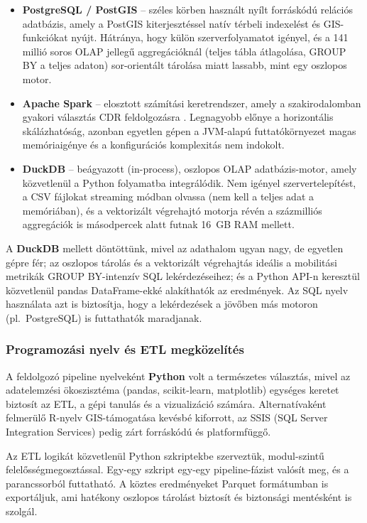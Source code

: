 \begin{itemize}
    \item \textbf{PostgreSQL / PostGIS} -- széles körben használt nyílt forráskódú relációs adatbázis, amely a PostGIS kiterjesztéssel natív térbeli indexelést és GIS-funkciókat nyújt. Hátránya, hogy külön szerverfolyamatot igényel, és a 141 millió soros OLAP jellegű aggregációknál (teljes tábla átlagolása, GROUP BY a teljes adaton) sor-orientált tárolása miatt lassabb, mint egy oszlopos motor.
    \item \textbf{Apache Spark} -- elosztott számítási keretrendszer, amely a szakirodalomban gyakori választás CDR feldolgozásra \cite{zhang2019connected}. Legnagyobb előnye a horizontális skálázhatóság, azonban egyetlen gépen a JVM-alapú futtatókörnyezet magas memóriaigénye és a konfigurációs komplexitás nem indokolt.
    \item \textbf{DuckDB} -- beágyazott (in-process), oszlopos OLAP adatbázis-motor, amely közvetlenül a Python folyamatba integrálódik. Nem igényel szervertelepítést, a CSV fájlokat streaming módban olvassa (nem kell a teljes adat a memóriában), és a vektorizált végrehajtó motorja révén a százmilliós aggregációk is másodpercek alatt futnak 16~GB RAM mellett.
\end{itemize}

A \textbf{DuckDB} mellett döntöttünk, mivel az adathalom ugyan nagy, de egyetlen gépre fér; az oszlopos tárolás és a vektorizált végrehajtás ideális a mobilitási metrikák GROUP BY-intenzív SQL lekérdezéseihez; és a Python API-n keresztül közvetlenül pandas DataFrame-ekké alakíthatók az eredmények. Az SQL nyelv használata azt is biztosítja, hogy a lekérdezések a jövőben más motoron (pl.\ PostgreSQL) is futtathatók maradjanak.

\subsubsection{Programozási nyelv és ETL megközelítés}

A feldolgozó pipeline nyelveként \textbf{Python} volt a természetes választás, mivel az adatelemzési ökoszisztéma (pandas, scikit-learn, matplotlib) egységes keretet biztosít az ETL, a gépi tanulás és a vizualizáció számára. Alternatívaként felmerülő R-nyelv GIS-támogatása kevésbé kiforrott, az SSIS (SQL Server Integration Services) pedig zárt forráskódú és platformfüggő.

Az ETL logikát közvetlenül Python szkriptekbe szerveztük, modul-szintű felelősségmegosztással. Egy-egy szkript egy-egy pipeline-fázist valósít meg, és a parancssorból futtatható. A köztes eredményeket Parquet formátumban is exportáljuk, ami hatékony oszlopos tárolást biztosít és biztonsági mentésként is szolgál.

